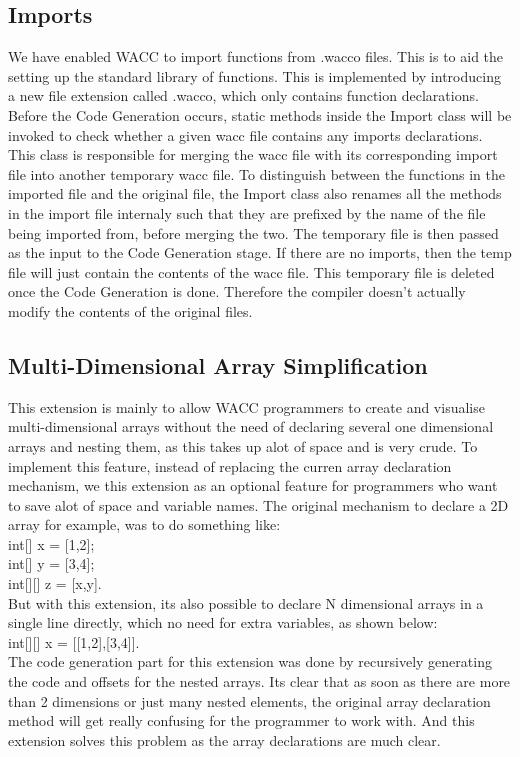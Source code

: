 \documentclass[a4paper]{article}
\theoremstyle{definition}
\begin{document}
\subsection{Imports}
We have enabled WACC to import functions from .wacco files. This is to aid the setting up the standard library of functions. 
This is implemented by introducing a new file extension called .wacco, which only contains function declarations. Before the Code Generation occurs, static methods inside the Import class will be invoked to check whether a given wacc file contains any imports declarations. This class is responsible for merging the wacc file with its corresponding import file into another temporary wacc file. To distinguish between the functions in the imported file and the original file, the Import class also renames all the methods in the import file internaly such that they are prefixed by the name of the file being imported from, before merging the two. The temporary file is then passed as the input to the Code Generation stage. If there are no imports, then the temp file will just contain the contents of the wacc file. This temporary file is deleted once the Code Generation is done. Therefore the compiler doesn't actually modify the contents of the original files.

\subsection{Multi-Dimensional Array Simplification}
This extension is mainly to allow WACC programmers to create and visualise multi-dimensional arrays without the need of declaring several one dimensional arrays and nesting them, as this takes up alot of space and is very crude. To implement this feature, instead of replacing the curren array declaration mechanism, we this extension as an optional feature for programmers who want to save alot of space and variable names. The original  mechanism to declare a 2D array for example, was to do something like:\\
int[] x = [1,2];\\
int[] y = [3,4];\\
int[][] z = [x,y].\\
But with this extension, its also possible to declare N dimensional arrays in a single line directly, which no need for extra variables, as shown below:\\
int[][] x = [[1,2],[3,4]].\\
The code generation part for this extension was done by recursively generating the code and offsets for the nested arrays. Its clear that as soon as there are more than 2 dimensions or just many nested elements, the original array declaration method will get really confusing for the programmer to work with. And this extension solves this problem as the array declarations are much clear.
\end{document}
